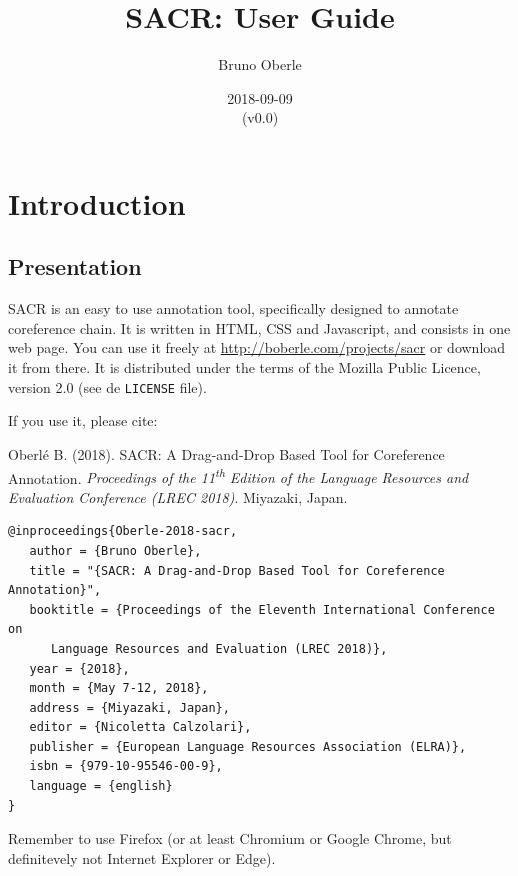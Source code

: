 \documentclass[12pt]{article}
\begin{document}
\title{SACR: User Guide}
\author{Bruno Oberle}
\date{2018-09-09\\(v0.0)}

\maketitle

\tableofcontents



 \section{Introduction}

 \subsection{Presentation}

SACR is an easy to use annotation tool, specifically designed to annotate
coreference chain.  It is written in HTML, CSS and Javascript, and consists in
one web page.  You can use it freely at \url{http://boberle.com/projects/sacr}
or download it from there.  It is distributed under the terms of the Mozilla
Public Licence, version 2.0 (see de \verb|LICENSE| file).

If you use it, please cite:

Oberlé B. (2018). SACR: A Drag-and-Drop Based Tool for Coreference
Annotation. \emph{Proceedings of the 11\textsuperscript{th} Edition of the
Language Resources and Evaluation Conference (LREC 2018)}. Miyazaki, Japan.

\begin{verbatim}
@inproceedings{Oberle-2018-sacr,
   author = {Bruno Oberle},
   title = "{SACR: A Drag-and-Drop Based Tool for Coreference Annotation}",
   booktitle = {Proceedings of the Eleventh International Conference on
      Language Resources and Evaluation (LREC 2018)},
   year = {2018},
   month = {May 7-12, 2018},
   address = {Miyazaki, Japan},
   editor = {Nicoletta Calzolari},
   publisher = {European Language Resources Association (ELRA)},
   isbn = {979-10-95546-00-9},
   language = {english}
}
\end{verbatim}

Remember to use Firefox (or at least Chromium or Google Chrome, but
definitevely not Internet Explorer or Edge).
\end{document}
